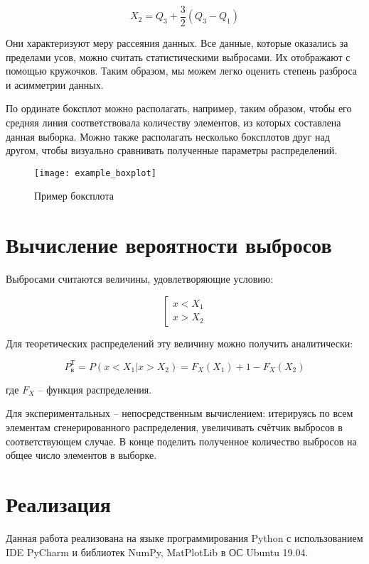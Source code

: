 \begin{equation}
	X_2 = Q_3 + \frac{3}{2}(Q_3-Q_1)
\end{equation}

Они характеризуют меру рассеяния данных. Все данные, которые оказались за пределами усов, можно считать статистическими выбросами. Их отображают с помощью кружочков. Таким образом, мы можем легко оценить степень разброса и асимметрии данных.

По ординате боксплот можно располагать, например, таким образом, чтобы его средняя линия соответствовала количеству элементов, из которых составлена данная выборка. Можно также располагать несколько боксплотов друг над другом, чтобы визуально сравнивать полученные параметры распределений.

\begin{figure}[H]
	\begin{center}
		\texttt{[image: example\_boxplot]}
		\caption{Пример боксплота}
		\label{pic:pic_name}	
	\end{center}
\end{figure}

\section{Вычисление вероятности выбросов}

Выбросами считаются величины, удовлетворяющие условию:


\begin{equation}
\left[
\begin{array}{c}
x < X_1 \\
x > X_2
\end{array}
\right.
\end{equation}

Для теоретических распределений эту величину можно получить аналитически:

\begin{equation}\label{trashdata}
P_{\text{в}}^{\text{Т}}=P(x<X_1 | x > X_2) = F_X(X_1) + 1 - F_X(X_2)
\end{equation}

где $F_X$ -- функция распределения.

Для экспериментальных -- непосредственным вычислением: итерируясь по всем элементам сгенерированного распределения, увеличивать счётчик выбросов в соответствующем случае. В конце поделить полученное количество выбросов на общее число элементов в выборке.
	
\section{Реализация}
Данная работа реализована на языке программирования Python с использованием IDE PyCharm и библиотек NumPy, MatPlotLib в ОС Ubuntu 19.04.

